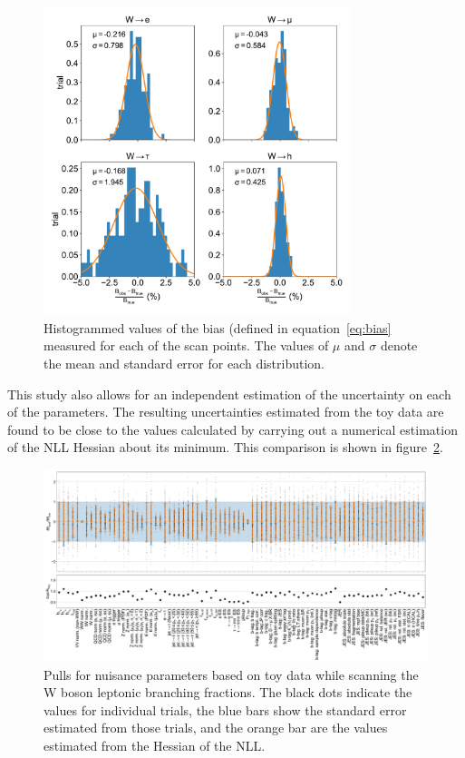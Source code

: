 \begin{figure}[htb!]
    \centering
    \includegraphics[width=0.8\textwidth]{chapters/Analysis/sectionStatisticalAnalysis/figures/beta_bias}
    \caption{Histogrammed values of the bias (defined in
    equation~\ref{eq:bias} measured for each of the scan points.  The
    values of $\mu$ and $\sigma$ denote the mean and standard error for
    each distribution.}
    \label{fig:bias_test}
\end{figure}

This study also allows for an independent estimation of the uncertainty
on each of the parameters.  The resulting uncertainties estimated from
the toy data are found to be close to the values calculated by carrying
out a numerical estimation of the NLL Hessian about its minimum.  This
comparison is shown in figure~\ref{fig:pulls_comparison}.

\begin{figure}[htb!]
    \centering
    \includegraphics[width=0.9\textheight, angle=-90]{chapters/Analysis/sectionStatisticalAnalysis/figures/new_pulls}
    \caption{Pulls for nuisance parameters based on toy data while
        scanning the W boson leptonic branching fractions.  The black
        dots indicate the values for individual trials, the blue bars
        show the standard error estimated from those trials, and the
        orange bar are the values estimated from the Hessian of the NLL.}
    \label{fig:pulls_comparison}
\end{figure}





